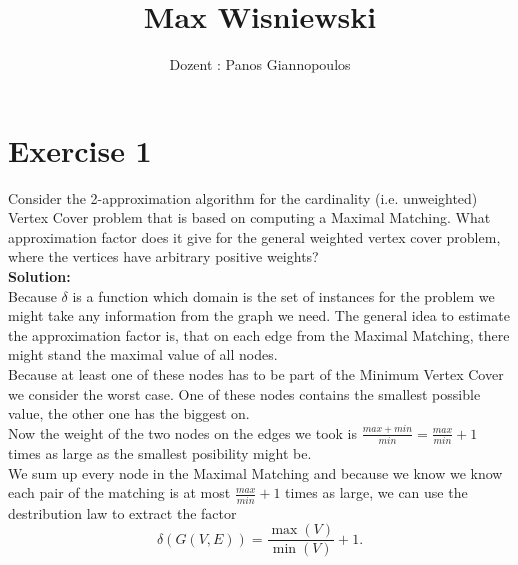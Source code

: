 \documentclass[11pt,a4paper,ngerman]{article}
\date{}
\title{Max Wisniewski}
\author{Dozent : Panos Giannopoulos}
\begin{document}

\renewcommand{\figurename}{Figure}

\maketitle
\thispagestyle{fancy}


\section*{Exercise 1}

Consider the 2-approximation algorithm for the cardinality (i.e. unweighted) Vertex Cover problem that is based on computing a Maximal Matching. What approximation factor does it give for the general weighted vertex cover problem, where the vertices have arbitrary positive weights?\\

\textbf{Solution:}\\
Because $\delta$ is a function which domain is the set of instances for the problem we might take any information from the graph we need. The general idea to estimate the approximation factor is, that on each edge from the Maximal Matching, there might stand the maximal value of all nodes.\\
Because at least one of these nodes has to be part of the Minimum Vertex Cover we consider the worst case. One of these nodes contains the smallest possible value, the other one has the biggest on.\\
Now the weight of the two nodes on the edges we took is $\frac{max+min}{min} = \frac{max}{min}+1$ times as large as the smallest posibility might be.\\
We sum up every node in the Maximal Matching and because we know we know each pair of the matching is at most $\frac{max}{min}+1$ times as large, we can use the destribution law to extract the factor 
$$
	\delta (G(V,E)) = \frac{\max (V)}{\min (V)} + 1.
$$
\end{document}
